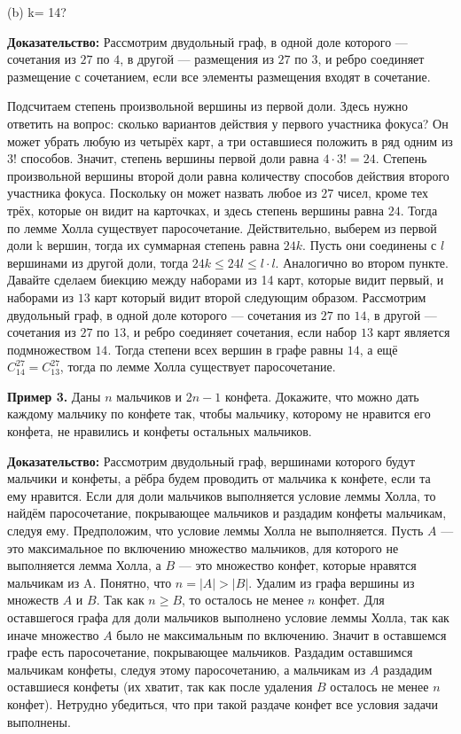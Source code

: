(b) k= 14?  

\textbf{Доказательство:} Рассмотрим двудольный граф, в одной доле которого — сочетания из $27$ по $4$, в другой — размещения из $27$ по $3$, и ребро соединяет размещение с сочетанием, если все элементы размещения входят в сочетание.

Подсчитаем степень произвольной вершины из первой доли. Здесь нужно ответить на вопрос: сколько вариантов действия у первого участника фокуса? Он может убрать любую из четырёх карт, а три оставшиеся положить в ряд одним из $3!$ способов. Значит, степень вершины первой доли равна $4 \cdot 3! = 24$. Степень произвольной вершины второй доли равна количеству способов действия второго участника фокуса. Поскольку он может назвать любое из $27$ чисел, кроме тех трёх, которые он видит на карточках, и здесь степень вершины равна $24$. Тогда по лемме Холла существует паросочетание. Действительно, выберем из первой доли k вершин, тогда их суммарная степень равна $24k$. Пусть они соединены с $l$ вершинами из другой доли, тогда $24k \leq 24l \leq l \cdot l$. Аналогично во втором пункте. Давайте сделаем биекцию между наборами из 14 карт, которые видит первый, и наборами из $13$ карт который видит второй следующим образом. Рассмотрим двудольный граф, в одной доле которого — сочетания из $27$ по $14$, в другой — сочетания из $27$ по $13$, и ребро соединяет сочетания, если набор $13$ карт является подмножеством $14$. Тогда степени всех вершин в графе равны $14$, а ещё $C_{14}^{27} = C_{13}^{27}$, тогда по лемме Холла существует паросочетание.

\textbf{Пример 3.} Даны $n$ мальчиков и $2n - 1$   конфета. Докажите, что можно дать каждому мальчику по конфете так, чтобы мальчику, которому не нравится его конфета, не нравились и конфеты остальных мальчиков.

\textbf{Доказательство:} Рассмотрим двудольный граф, вершинами которого будут мальчики и конфеты, а рёбра будем проводить от мальчика к конфете, если та ему нравится. Если для доли мальчиков выполняется условие леммы Холла, то найдём паросочетание, покрывающее мальчиков и раздадим конфеты мальчикам, следуя ему. Предположим, что условие леммы Холла не выполняется. Пусть $A$ — это максимальное по включению множество мальчиков, для которого не выполняется лемма Холла, а $B$ — это множество конфет, которые нравятся мальчикам из A. Понятно, что $n = |A| > |B|$. Удалим из графа вершины из множеств $A$ и $B$. Так как $n \geq B$, то осталось не менее $n$ конфет. Для оставшегося графа для доли мальчиков выполнено условие леммы Холла, так как иначе множество $A$ было не максимальным по включению. Значит в оставшемся графе есть паросочетание, покрывающее мальчиков. Раздадим оставшимся мальчикам конфеты, следуя этому паросочетанию, а мальчикам из $A$ раздадим оставшиеся конфеты (их хватит, так как после удаления $B$ осталось не менее $n$ конфет). Нетрудно убедиться, что при такой раздаче конфет все условия задачи выполнены.
